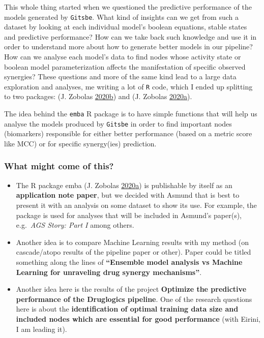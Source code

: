 \documentclass[
  12pt,
]{book}
\begin{document}
This whole thing started when we questioned the predictive performance of the models generated by \texttt{Gitsbe}.
What kind of insights can we get from such a dataset by looking at each individual model's boolean equations, stable states and predictive performance?
How can we take back such knowledge and use it in order to understand more about how to generate better models in our pipeline?
How can we analyse each model's data to find nodes whose activity state or boolean model parameterization affects the manifestation of specific observed synergies?
These questions and more of the same kind lead to a large data exploration and analyses, me writing a lot of \texttt{R} code, which I ended up splitting to two packages: (J. Zobolas \protect\hyperlink{ref-R-usefun}{2020}\protect\hyperlink{ref-R-usefun}{b}) and (J. Zobolas \protect\hyperlink{ref-R-emba}{2020}\protect\hyperlink{ref-R-emba}{a}).

The idea behind the \texttt{emba} R package is to have simple functions that will help us analyse the models produced by \texttt{Gitsbe} in order to find important nodes (biomarkers) responsible for either better performance (based on a metric score like MCC) or for specific synergy(ies) prediction.

\hypertarget{what-might-come-of-this}{%
\subsubsection*{What might come of this?}\label{what-might-come-of-this}}

\begin{itemize}
\item
  The R package emba (J. Zobolas \protect\hyperlink{ref-R-emba}{2020}\protect\hyperlink{ref-R-emba}{a}) is publishable by itself as an \textbf{application note paper}, but we decided with Asmund that is best to present it with an analysis on some dataset to show its use.
  For example, the package is used for analyses that will be included in Asmund's paper(s), e.g.~\emph{AGS Story: Part I} among others.
\item
  Another idea is to compare Machine Learning results with my method (on cascade/atopo results of the pipeline paper or other).
  Paper could be titled something along the lines of \textbf{``Ensemble model analysis vs Machine Learning for unraveling drug synergy mechanisms''}.
\item
  Another idea here is the results of the project \textbf{Optimize the predictive performance of the Druglogics pipeline}.
  One of the research questions here is about the \textbf{identification of optimal training data size and included nodes which are essential for good performance} (with Eirini, I am leading it).
\end{itemize}
\end{document}
